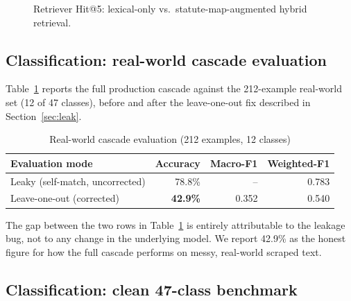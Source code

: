 \documentclass[conference]{IEEEtran}
\begin{document}
\begin{figure}[t]
\centering
{}
\caption{Retriever Hit@5: lexical-only vs.\ statute-map-augmented hybrid retrieval.}
\label{fig:retriever}
\end{figure}

\subsection{Classification: real-world cascade evaluation}

Table~\ref{tab:realworld} reports the full production cascade against the 212-example real-world set (12 of 47 classes), before and after the leave-one-out fix described in Section~\ref{sec:leak}.

\begin{table}[t]
\caption{Real-world cascade evaluation (212 examples, 12 classes)}
\label{tab:realworld}
\centering
\begin{tabular}{@{}lrrr@{}}
\toprule
Evaluation mode & Accuracy & Macro-F1 & Weighted-F1 \\
\midrule
Leaky (self-match, uncorrected) & 78.8\% & -- & 0.783 \\
Leave-one-out (corrected) & \textbf{42.9\%} & 0.352 & 0.540 \\
\bottomrule
\end{tabular}
\end{table}

The gap between the two rows in Table~\ref{tab:realworld} is entirely attributable to the leakage bug, not to any change in the underlying model. We report 42.9\% as the honest figure for how the full cascade performs on messy, real-world scraped text.

\subsection{Classification: clean 47-class benchmark}
\end{document}

